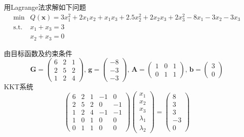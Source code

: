 \begin{example}
    用Lagrange法求解如下问题
    \[
        \begin{array}{rl}
            \operatorname*{min}& Q(\boldsymbol{x})=3x_{1}^{2}+2x_{1}x_{2}+x_{1}x_{3}+2.5x_{2}^{2}+2x_{2}x_{3}+2x_{3}^{2}-8x_{1}-3x_{2}-3x_{3}\\
            \mathrm{s.t.}&x_{1}+x_{3}=3\\
            &x_{2}+x_{3}=0
        \end{array}
    \]
    \begin{solution}
        由目标函数及约束条件
        \[
            \boldsymbol{G}=
                \begin{pmatrix}
                    6&2&1\\2&5&2\\1&2&4
                \end{pmatrix},\,
            \boldsymbol{g}=
                \begin{pmatrix}
                    -8\\-3\\-3
                \end{pmatrix},\,
            \boldsymbol{A}=
                \begin{pmatrix}
                    1&0&1\\0&1&1
                \end{pmatrix},\,
            \boldsymbol{b}=
                \begin{pmatrix}
                    3\\0
                \end{pmatrix}
            \]
            KKT系统
            \[
                \begin{pmatrix}
                    6&2&1&-1&0\\2&5&2&0&-1\\1&2&4&-1&-1\\1&0&1&0&0\\0&1&1&0&0
                \end{pmatrix}
                \begin{pmatrix}
                    x_1\\x_2\\x_3\\\lambda_1\\\lambda_2
                \end{pmatrix} = 
                \begin{pmatrix}
                    8\\3\\3\\-3\\0

\end{pmatrix}\]
\end{solution}
\end{example}
